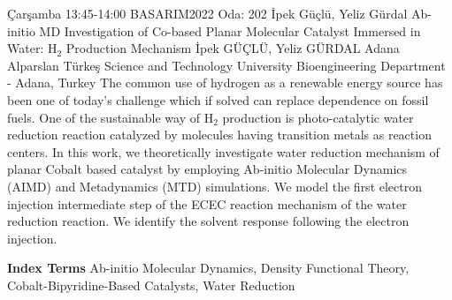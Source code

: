 
    \begin{abstract_basarim}
    {Çarşamba 13:45-14:00}
    {BASARIM2022}
    {Oda: 202}
    {İpek Güçlü, Yeliz Gürdal}
    {Ab-initio MD Investigation of Co-based Planar Molecular Catalyst Immersed in Water: $\mathrm{H}_{2}$ Production Mechanism}
    {%
    İpek GÜÇLÜ, Yeliz GÜRDAL}
    {%
    }
    {%
    Adana Alparslan Türkeş Science and Technology University Bioengineering Department - Adana, Turkey}
    The common use of hydrogen as a renewable energy source has been one of today's challenge which if solved can replace dependence on fossil fuels. One of the sustainable way of $\mathrm{H}_{2}$ production is photo-catalytic water reduction reaction catalyzed by molecules having transition metals as reaction centers. In this work, we theoretically investigate water reduction mechanism of planar Cobalt based catalyst by employing Ab-initio Molecular Dynamics (AIMD) and Metadynamics (MTD) simulations. We model the first electron injection intermediate step of the ECEC reaction mechanism of the water reduction reaction. We identify the solvent response following the electron injection. 
    
            \textbf{Index Terms} \newline{}Ab-initio Molecular Dynamics, Density Functional Theory, Cobalt-Bipyridine-Based Catalysts, Water Reduction
    \end{abstract_basarim}
    
